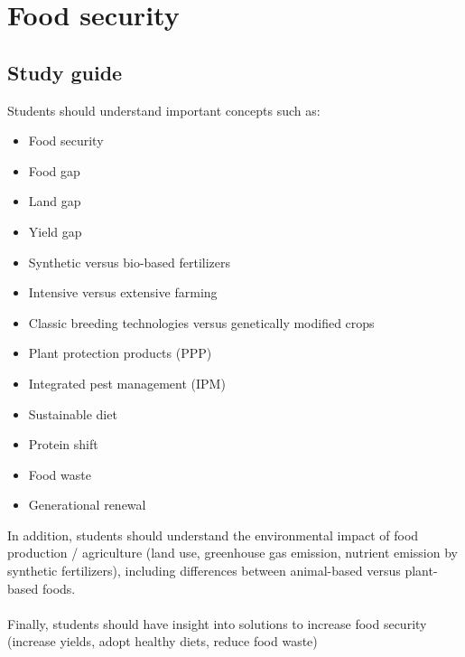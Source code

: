 \documentclass[../summary.tex]{subfiles}
\begin{document}
	
	\section{Food security}
	
	\subsection{Study guide}
	Students should understand important concepts such as:
	\begin{itemize} 
	\item Food security
	\item Food gap
	\item Land gap
	\item Yield gap
	\item Synthetic versus bio-based fertilizers
	\item Intensive versus extensive farming
	\item Classic breeding technologies versus genetically modified crops
	\item Plant protection products (PPP)
	\item Integrated pest management (IPM)
	\item Sustainable diet
	\item Protein shift
	\item Food waste
	\item Generational renewal
	\end{itemize}
	In addition, students should understand the environmental impact of food production / agriculture (land use, greenhouse gas emission, nutrient emission by synthetic fertilizers), including differences between animal-based versus plant-based foods.
	\\
	\\
	Finally, students should have insight into solutions to increase food security (increase yields, adopt healthy
	diets, reduce food waste)
	
\end{document}

